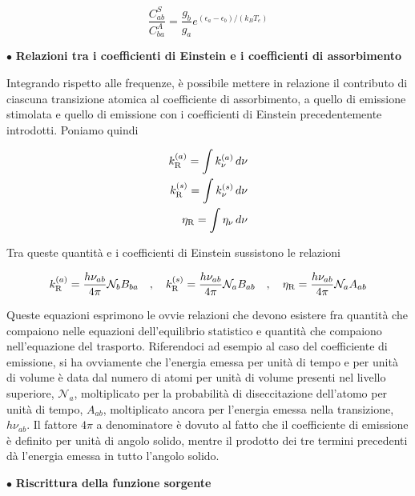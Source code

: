 \begin{equation}
  \frac{C_{ab}^S}{C_{ba}^A}=\frac{g_b}{g_a}e^{(\epsilon_a - \epsilon_b)/(k_B T_e)}
  \label{eq:Milne-Einstein}
\end{equation}

$\bullet$ \textbf{Relazioni tra i coefficienti di Einstein e i coefficienti di assorbimento}

\vspace{0.2cm}Integrando rispetto alle frequenze, è possibile mettere in relazione il contributo di ciascuna transizione atomica al coefficiente di assorbimento, a quello di emissione stimolata e quello di emissione con i coefficienti di Einstein precedentemente introdotti. Poniamo quindi

\begin{eqnarray*}
  k_{\rm R}^{(a)}=\int k_{\nu}^{(a)} \, d\nu\\
  k_{\rm R}^{(s)}=\int k_{\nu}^{(s)} \, d\nu\\
  \eta_{\rm R}=\int \eta_{\nu} \, d\nu
\end{eqnarray*}

Tra queste quantità e i coefficienti di Einstein sussistono le relazioni

\begin{equation*}
  k_{\rm R}^{(a)}=\frac{h \nu_{ab}}{4 \pi} \mathcal{N}_b B_{ba}
  \quad,\quad
  k_{\rm R}^{(s)}=\frac{h \nu_{ab}}{4 \pi} \mathcal{N}_a B_{ab}
  \quad,\quad
  \eta_{\rm R}=\frac{h \nu_{ab}}{4 \pi} \mathcal{N}_a A_{ab}
\end{equation*}

Queste equazioni esprimono le ovvie relazioni che devono esistere fra quantità che compaiono nelle equazioni dell'equilibrio statistico e quantità che compaiono nell'equazione del trasporto. Riferendoci ad esempio al caso del coefficiente di emissione, si ha ovviamente che l'energia emessa per unità di tempo e per unità di volume è data dal numero di atomi per unità di volume presenti nel livello superiore, $\mathcal{N}_a$, moltiplicato per la probabilità di diseccitazione dell'atomo per unità di tempo, $A_{ab}$, moltiplicato ancora per l'energia emessa nella transizione, $h \nu_{ab}$. Il fattore $4 \pi$ a denominatore è dovuto al fatto che il coefficiente di emissione è definito per unità di angolo solido, mentre il prodotto dei tre
termini precedenti dà l'energia emessa in tutto l'angolo solido.

\vspace{0.2cm}$\bullet$ \textbf{Riscrittura della funzione sorgente}

